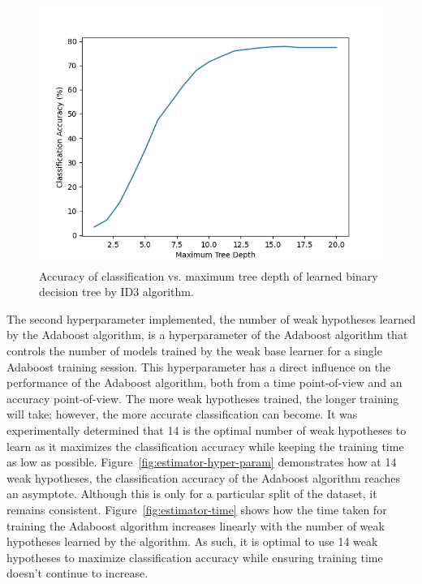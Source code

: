 \documentclass[a4paper]{article}
\begin{document}
\begin{figure}[h!]
    \centering
    \includegraphics[scale=0.6]{images/tree-depth-plot.png}
    \caption{Accuracy of classification vs. maximum tree depth of learned binary decision tree by ID3 algorithm.}
    \label{fig:depth-hyper-param}
\end{figure}

The second hyperparameter implemented, the number of weak hypotheses learned by the Adaboost algorithm, is a hyperparameter of the Adaboost algorithm that controls the number of models trained by the weak base learner for a single Adaboost training session. This hyperparameter has a direct influence on the performance of the Adaboost algorithm, both from a time point-of-view and an accuracy point-of-view. The more weak hypotheses trained, the longer training will take; however, the more accurate classification can become. It was experimentally determined that 14 is the optimal number of weak hypotheses to learn as it maximizes the classification accuracy while keeping the training time as low as possible. Figure~\ref{fig:estimator-hyper-param} demonstrates how at 14 weak hypotheses, the classification accuracy of the Adaboost algorithm reaches an asymptote. Although this is only for a particular split of the dataset, it remains consistent. Figure~\ref{fig:estimator-time} shows how the time taken for training the Adaboost algorithm increases linearly with the number of weak hypotheses learned by the algorithm. As such, it is optimal to use 14 weak hypotheses to maximize classification accuracy while ensuring training time doesn't continue to increase.
\end{document}
